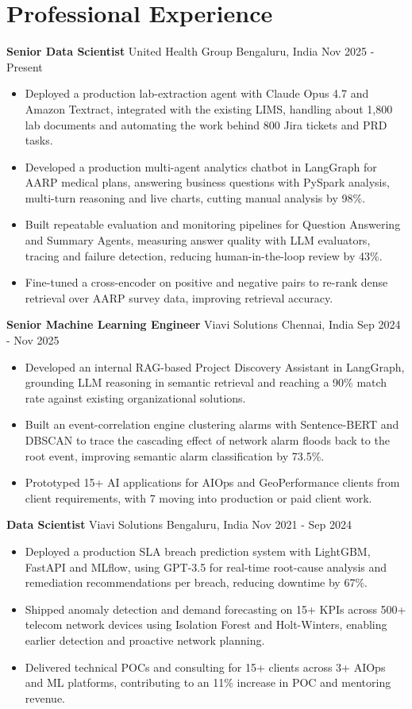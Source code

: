 \documentclass[10pt,a4paper]{article}
\newcommand{\role}[4]{\textbf{#1} \textbar{} #2 \hfill #3 \textbar{} #4\par}
\begin{document}
\section{Professional Experience}
\role{Senior Data Scientist}{United Health Group}{Bengaluru, India}{Nov 2025 - Present}
\begin{itemize}
  \item Deployed a production lab-extraction agent with Claude Opus 4.7 and Amazon Textract, integrated with the existing LIMS, handling about 1,800 lab documents and automating the work behind 800 Jira tickets and PRD tasks.
  \item Developed a production multi-agent analytics chatbot in LangGraph for AARP medical plans, answering business questions with PySpark analysis, multi-turn reasoning and live charts, cutting manual analysis by 98\%.
  \item Built repeatable evaluation and monitoring pipelines for Question Answering and Summary Agents, measuring answer quality with LLM evaluators, tracing and failure detection, reducing human-in-the-loop review by 43\%.
  \item Fine-tuned a cross-encoder on positive and negative pairs to re-rank dense retrieval over AARP survey data, improving retrieval accuracy.
\end{itemize}
\vspace{3pt}
\role{Senior Machine Learning Engineer}{Viavi Solutions}{Chennai, India}{Sep 2024 - Nov 2025}
\begin{itemize}
  \item Developed an internal RAG-based Project Discovery Assistant in LangGraph, grounding LLM reasoning in semantic retrieval and reaching a 90\% match rate against existing organizational solutions.
  \item Built an event-correlation engine clustering alarms with Sentence-BERT and DBSCAN to trace the cascading effect of network alarm floods back to the root event, improving semantic alarm classification by 73.5\%.
  \item Prototyped 15+ AI applications for AIOps and GeoPerformance clients from client requirements, with 7 moving into production or paid client work.
\end{itemize}
\vspace{3pt}
\role{Data Scientist}{Viavi Solutions}{Bengaluru, India}{Nov 2021 - Sep 2024}
\begin{itemize}
  \item Deployed a production SLA breach prediction system with LightGBM, FastAPI and MLflow, using GPT-3.5 for real-time root-cause analysis and remediation recommendations per breach, reducing downtime by 67\%.
  \item Shipped anomaly detection and demand forecasting on 15+ KPIs across 500+ telecom network devices using Isolation Forest and Holt-Winters, enabling earlier detection and proactive network planning.
  \item Delivered technical POCs and consulting for 15+ clients across 3+ AIOps and ML platforms, contributing to an 11\% increase in POC and mentoring revenue.
\end{itemize}
\end{document}
